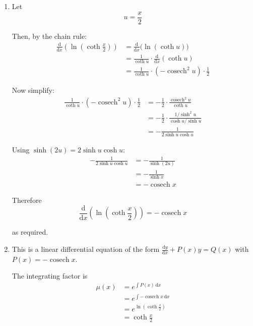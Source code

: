 \documentclass[leqno]{article}
\begin{document}
\begin{enumerate}[
  label=\textbf{\arabic*.},
  leftmargin=*,
  topsep=0pt,
  partopsep=0pt,
  parsep=0pt
]
\vspace*{10pt}

\begin{djsSolution}
\begin{enumerate}[label=\textbf{(\alph*)}]
  \item Let
\[
u=\frac{x}{2}
\]

Then, by the chain rule:
\begin{align*}
\frac{\mathrm{d}}{\mathrm{d}x}\left(\ln\left(\coth \frac{x}{2}\right)\right)
&= \frac{\mathrm{d}}{\mathrm{d}x}\bigl(\ln(\coth u)\bigr) \\
&= \frac{1}{\coth u}\cdot \frac{\mathrm{d}}{\mathrm{d}x}(\coth u) \\
&= \frac{1}{\coth u}\cdot \left(-\operatorname{cosech}^2 u\right)\cdot \frac{1}{2}
\end{align*}

Now simplify:
\begin{align*}
\frac{1}{\coth u}\cdot \left(-\operatorname{cosech}^2 u\right)\cdot \frac{1}{2}
&= -\frac{1}{2}\cdot \frac{\operatorname{cosech}^2 u}{\coth u} \\
&= -\frac{1}{2}\cdot \frac{1/\sinh^2 u}{\cosh u/\sinh u} \\
&= -\frac{1}{2\sinh u\cosh u}
\end{align*}

Using \(\sinh(2u)=2\sinh u\cosh u\):
\begin{align*}
-\frac{1}{2\sinh u\cosh u}
&= -\frac{1}{\sinh(2u)} \\
&= -\frac{1}{\sinh x} \\
&= -\operatorname{cosech} x
\end{align*}

Therefore
\[
\frac{\mathrm{d}}{\mathrm{d}x}\left(\ln\left(\coth \frac{x}{2}\right)\right)=-\operatorname{cosech} x
\]

as required.

  \item This is a linear differential equation of the form \(\frac{\mathrm{d}y}{\mathrm{d}x}+P(x)y=Q(x)\) with \(P(x)=-\operatorname{cosech} x\).

The integrating factor is
\begin{align*}
\mu(x)
&= e^{\int P(x)\,\mathrm{d}x} \\
&= e^{\int -\operatorname{cosech} x\,\mathrm{d}x} \\
&= e^{\ln\left(\coth \frac{x}{2}\right)} \\
&= \coth \frac{x}{2}
\end{align*}


\end{enumerate}
\end{djsSolution}
\end{enumerate}
\end{document}
